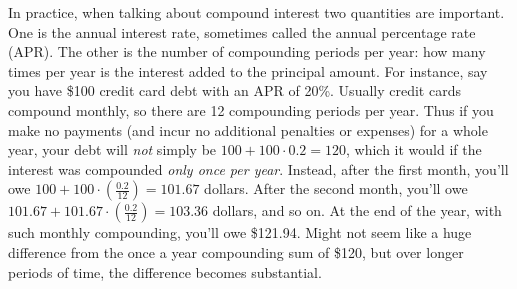 In practice, when talking about compound interest two quantities are important. One is the annual interest rate, sometimes called the annual percentage rate (APR). The other is the number of compounding periods per year: how many times per year is the interest added to the principal amount. For instance, say you have \$100 credit card debt with an APR of 20\%. Usually credit cards compound monthly, so there are 12 compounding periods per year. Thus if you make no payments (and incur no additional penalties or expenses) for a whole year, your debt will \emph{not} simply be $100+100\cdot 0.2=120$, which it would if the interest was compounded \emph{only once per year}. Instead, after the first month, you'll owe $100+100\cdot \left(\frac{0.2}{12}\right)=101.67$ dollars. After the second month, you'll owe $101.67+101.67\cdot \left(\frac{0.2}{12}\right)=103.36$ dollars, and so on. At the end of the year, with such monthly compounding, you'll owe \$121.94. Might not seem like a huge difference from the once a year compounding sum of \$120, but over longer periods of time, the difference becomes substantial. \\

 \vspace{0.2cm}

